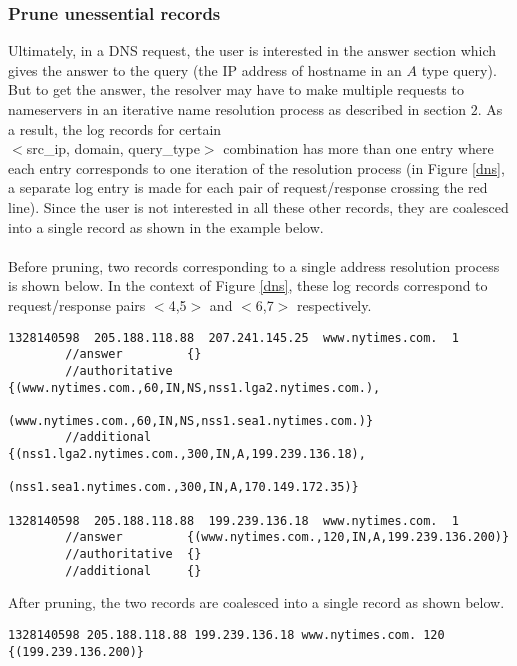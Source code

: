 \documentclass[11pt,a4paper]{article}
\begin{document}
\subsubsection{Prune unessential records}
Ultimately, in a DNS request, the user is interested in the answer section which gives the answer to the query (the IP address of hostname in an $A$ type query). But to get the answer, the resolver may have to make multiple requests to nameservers in an iterative name resolution process as described in section $2$. As a result, the log records for certain \\$<$src\_ip, domain, query\_type$>$ combination has more than one entry where each entry corresponds to one iteration of the resolution process (in Figure \ref{dns}, a separate log entry is made for each pair of request/response crossing the red line). Since the user is not interested in all these other records, they are coalesced into a single record as shown in the example below.
\\\\
Before pruning, two records corresponding to a single address resolution process is shown below. In the context of Figure \ref{dns}, these log records correspond to request/response pairs $<$4,5$>$ and $<$6,7$>$ respectively. 
\begin{verbatim}
1328140598  205.188.118.88  207.241.145.25  www.nytimes.com.  1 
        //answer         {}    
        //authoritative  {(www.nytimes.com.,60,IN,NS,nss1.lga2.nytimes.com.),
                          (www.nytimes.com.,60,IN,NS,nss1.sea1.nytimes.com.)} 
        //additional     {(nss1.lga2.nytimes.com.,300,IN,A,199.239.136.18), 
                          (nss1.sea1.nytimes.com.,300,IN,A,170.149.172.35)}
                              
1328140598  205.188.118.88  199.239.136.18  www.nytimes.com.  1 
        //answer         {(www.nytimes.com.,120,IN,A,199.239.136.200)} 
        //authoritative  {}
        //additional     {}  
\end{verbatim}
After pruning, the two records are coalesced into a single record as shown below.
\begin{verbatim}
1328140598 205.188.118.88 199.239.136.18 www.nytimes.com. 120 {(199.239.136.200)}
\end{verbatim}
\end{document}
